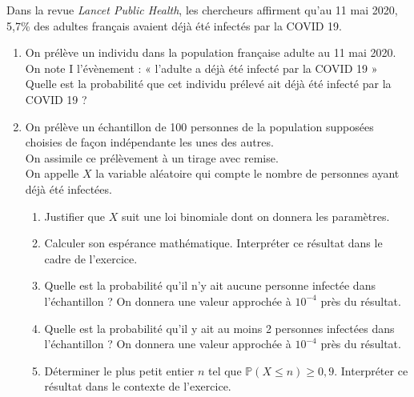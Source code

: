 \documentclass[11pt,fleqn, openany]{book} %
\begin{document}
\begin{exercise}[topic=prob12, subtitle={(Asie 2024)}]
Dans la revue \textit{Lancet Public Health}, les chercheurs affirment qu’au 11 mai 2020, 5,7\% des adultes français avaient déjà été infectés par la COVID 19.

\begin{enumerate}
\item On prélève un individu dans la population française adulte au 11 mai 2020.\\
On note I l'évènement : « l'adulte a déjà été infecté par la COVID 19 »\\
Quelle est la probabilité que cet individu prélevé ait déjà été infecté par la COVID 19 ?
\item On prélève un échantillon de 100 personnes de la population supposées choisies de façon indépendante les unes des autres.\\ On assimile ce prélèvement à un tirage avec remise. \\On appelle $X$ la variable aléatoire qui compte le nombre de personnes ayant déjà été infectées.
\begin{enumerate}
\item Justifier que $X$ suit une loi binomiale dont on donnera les paramètres.
\item Calculer son espérance mathématique. Interpréter ce résultat dans le cadre
de l'exercice.
\item Quelle est la probabilité qu'il n'y ait aucune personne infectée dans l'échantillon ?
On donnera une valeur approchée à $10^{-4}$ près du résultat.
\item Quelle est la probabilité qu'il y ait au moins 2 personnes infectées dans l'échantillon ?
On donnera une valeur approchée à $10^{-4}$ près du résultat.
\item Déterminer le plus petit entier $n$ tel que $\mathbb{P}(X \leqslant n) \geqslant 0,9$.
Interpréter ce résultat dans le contexte de l'exercice.\end{enumerate}
\end{enumerate}
\end{exercise}
\end{document}
